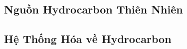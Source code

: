\documentclass{article}
\begin{document}

\subsection{Nguồn Hydrocarbon Thiên Nhiên}


\subsection{Hệ Thống Hóa về Hydrocarbon}


\printbibliography[heading=bibintoc]
	
\end{document}
